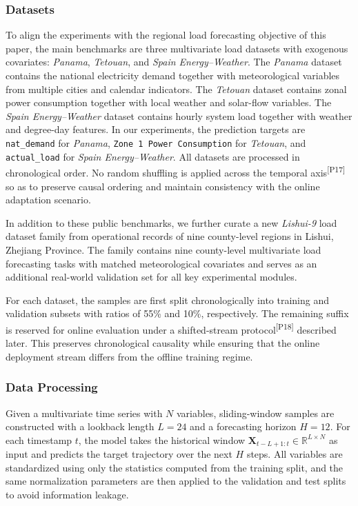 ﻿\documentclass[journal]{IEEEtran}
\DeclareRobustCommand{\auditbad}[2]{{\color{auditred}#1}{\color{auditred}\textsuperscript{[#2]}}}
\begin{document}
\subsubsection{Datasets}
To align the experiments with the regional load forecasting objective of this paper, the main benchmarks are three multivariate load datasets with exogenous covariates: \textit{Panama}, \textit{Tetouan}, and \textit{Spain Energy--Weather}. The \textit{Panama} dataset contains the national electricity demand together with meteorological variables from multiple cities and calendar indicators. The \textit{Tetouan} dataset contains zonal power consumption together with local weather and solar-flow variables. The \textit{Spain Energy--Weather} dataset contains hourly system load together with weather and degree-day features. In our experiments, the prediction targets are \texttt{nat\_demand} for \textit{Panama}, \texttt{Zone 1 Power Consumption} for \textit{Tetouan}, and \texttt{actual\_load} for \textit{Spain Energy--Weather}. All datasets are processed in chronological order. \auditbad{No random shuffling is applied across the temporal axis}{P17} so as to preserve causal ordering and maintain consistency with the online adaptation scenario.

In addition to these public benchmarks, we further curate a new \textit{Lishui-9} load dataset family from operational records of nine county-level regions in Lishui, Zhejiang Province. The family contains nine county-level multivariate load forecasting tasks with matched meteorological covariates and serves as an additional real-world validation set for all key experimental modules.

For each dataset, the samples are first split chronologically into training and validation subsets with ratios of 55\% and 10\%, respectively. The remaining suffix is reserved for online evaluation under a \auditbad{shifted-stream protocol}{P18} described later. This preserves chronological causality while ensuring that the online deployment stream differs from the offline training regime.

\subsubsection{Data Processing}
Given a multivariate time series with $N$ variables, sliding-window samples are constructed with a lookback length $L=24$ and a forecasting horizon $H=12$. For each timestamp $t$, the model takes the historical window $\mathbf{X}_{t-L+1:t}\in\mathbb{R}^{L\times N}$ as input and predicts the target trajectory over the next $H$ steps. All variables are standardized using only the statistics computed from the training split, and the same normalization parameters are then applied to the validation and test splits to avoid information leakage.
\end{document}

